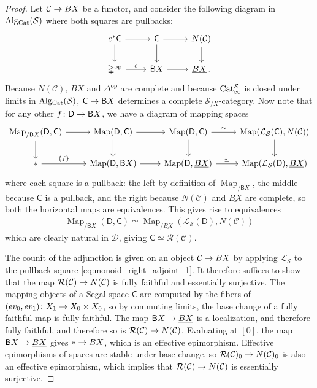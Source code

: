 \documentclass[10pt]{amsart}
\numberwithin{equation}{section}
\theoremstyle{definition}
\DeclareMathOperator{\Map}{Map}
\DeclareMathOperator{\op}{op}
\newcommand{\Cat}{\mathrm{Cat}\vphantom{t}}
\newcommand{\Alg}{\mathrm{Alg}\vphantom{z}}
\newcommand{\Simp}{\mathbb{\Delta}}
\newcommand{\cC}{\mathcal{C}}
\newcommand{\calD}{\mathcal{D}}
\newcommand{\cS}{\mathcal{S}}
\newcommand{\cL}{\mathcal{L}}
\newcommand{\cR}{\mathcal{R}}
\newcommand{\sfB}{\mathsf{B}}
\newcommand{\sfC}{\mathsf{C}}
\newcommand{\sfD}{\mathsf{D}}
\renewcommand{\to}{\mathchoice{\longrightarrow}{\rightarrow}{}{}}
\begin{document}
	\begin{proof}
		Let $\cC\to BX$ be a functor, and consider the following diagram in $\Alg_{\Cat}(\cS)$ where both squares are pullbacks:
		\begin{equation*}
			\begin{tikzcd}
				e^{*}\sfC \arrow[r] \arrow[d]      &    \sfC \arrow [r] \arrow[d] & N(\cC)  \arrow[d] \\
				\Simp^{\op} \arrow[r, "e"]   &      \sfB X \arrow[r]       &  \underline{BX} \,.
			\end{tikzcd}
		\end{equation*}
	    Because $N(\cC)$, $\underline{BX}$ and $\Simp^{\op}$ are complete and because $\Cat_{\infty}^{\cS}$ is closed under limits in $\Alg_{\Cat}(\cS)$, $\sfC\to \sfB X$ determines a complete $\cS_{/X}$-category. Now note that for any other $f\colon \sfD \to \sfB X$, we have a diagram of mapping spaces
		\begin{equation*}
			\begin{tikzcd}
				\Map_{/\sfB X}(\sfD, \sfC) \arrow[r] \arrow[d]      &   \Map(\sfD, \sfC)  \arrow[d]  \arrow[r] & \Map(\sfD, \sfC) \arrow[d] \arrow[r, "\simeq"] & \Map(\cL_{\cS}(\sfC), N(\cC) ) \arrow[d] \\
				\ast   \arrow[r, "\left\{ f\right\}"]               &   \Map(\sfD, \sfB X)  \arrow[r]            & \Map(\sfD, \underline{BX}) \arrow[r, "\simeq"] & \Map(\cL_{\cS}(\sfD),\underline{BX})
			\end{tikzcd}
		\end{equation*}
		where each square is a pullback: the left by definition of $\Map_{/\sfB X}$, the middle because $\sfC$ is a pullback, and the right because $N(\cC)$ and $\underline{BX}$ are complete, so both the horizontal maps are equivalences. This gives rise to equivalences
		\begin{align*}
			\Map_{/\sfB X}(\sfD, \sfC) \simeq \Map_{/\underline{BX}}(\cL_{\cS}(\sfD), N(\cC))
		\end{align*}
		which are clearly natural in $\calD$, giving $\sfC \simeq \cR(\cC)$.


		The counit of the adjunction is given on an object $\cC \to BX$ by applying $\cL_{\cS}$ to the pullback square \eqref{eq:monoid_right_adjoint_1}.
    It therefore suffices to show that the map $\cR(\cC) \to N(\cC)$ is fully faithful and essentially surjective.
    The mapping objects of a Segal space $\sfC$ are computed by the fibers of $(ev_{0},ev_{1})\colon X_{1}\to X_{0}\times X_{0}$, so by commuting limits, the base change of a fully faithful map is fully faithful.
    The map $\sfB X \to \underline{BX}$ is a localization, and therefore fully faithful, and therefore so is $\cR(\cC) \to N(\cC)$.
    Evaluating at $[0]$, the map $\sfB X \to \underline{BX}$ gives $\ast \to BX$, which is an effective epimorphism.
    Effective epimorphisms of spaces are stable under base-change, so $\cR(\cC)_{0} \to N(\cC)_{0}$ is also an effective epimorphism, which implies that $\cR(\cC) \to N(\cC)$ is essentially surjective.
	\end{proof}
\end{document}
